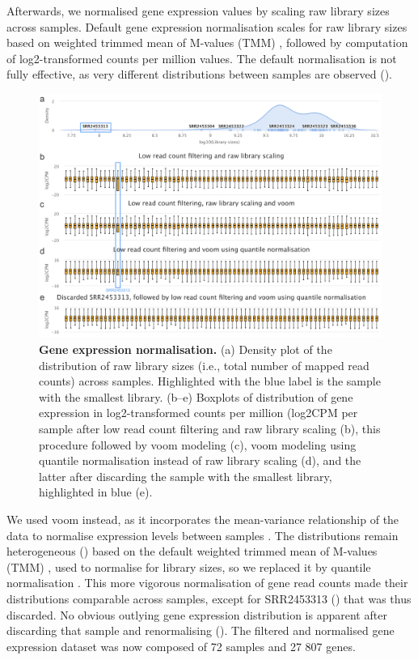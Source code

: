 Afterwards, we normalised gene expression values by scaling raw library sizes across samples. Default gene expression normalisation scales for raw library sizes based on weighted trimmed mean of M-values (TMM) \cite{robinson:2010wx}, followed by computation of log2-transformed counts per million values. The default normalisation is not fully effective, as very different distributions between samples are observed ().

\begin{figure}[!ht]
  \includegraphics[width=1\textwidth]{images/psichomics/1-gene-expr-normalisation}
  \centering
  \caption[Gene expression normalisation]{\textbf{Gene expression normalisation.} (a) Density plot of the distribution of raw library sizes (i.e., total number of mapped read counts) across samples. Highlighted with the blue label is the sample with the smallest library. (b–e) Boxplots of distribution of gene expression in log2-transformed counts per million (log2CPM per sample after low read count filtering and raw library scaling (b), this procedure followed by voom modeling (c), voom modeling using quantile normalisation instead of raw library scaling (d), and the latter after discarding the sample with the smallest library, highlighted in blue (e).}
  \label{fig:psichomics-ge-norm}
\end{figure}

We used voom instead, as it incorporates the mean-variance relationship of the data to normalise expression levels between samples \cite{ritchie:2015tm}. The distributions remain heterogeneous () based on the default weighted trimmed mean of M-values (TMM) \cite{robinson:2010wx}, used to normalise for library sizes, so we replaced it by quantile normalisation \cite{ritchie:2015tm}. This more vigorous normalisation of gene read counts made their distributions comparable across samples, except for SRR2453313 () that was thus discarded. No obvious outlying gene expression distribution is apparent after discarding that sample and renormalising (). The filtered and normalised gene expression dataset was now composed of 72 samples and 27 807 genes.

